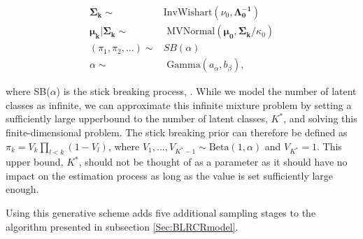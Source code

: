\documentclass[
  12pt,
]{article}
\begin{document}
\begin{align}
\boldsymbol{\Sigma_k} \sim & \text{InvWishart}(\nu_{0},\boldsymbol{\Lambda_{0}^{-1}}) \\
\boldsymbol{\mu_k}|\boldsymbol{\Sigma_k} \sim & \text{ MVNormal}(\boldsymbol{\mu_{0}},\boldsymbol{\Sigma_k}/\kappa_{0}) \\
(\pi_1,\pi_2,...) \sim & SB(\alpha) \\
\alpha \sim & \text{ Gamma}(a_{\alpha},b_{\beta}),
\end{align}

where SB(\(\alpha\)) is the stick breaking process,
\citep{ishwaran_gibbs_2001}. While we model the number of latent classes
as infinite, we can approximate this infinite mixture problem by setting
a sufficiently large upperbound to the number of latent classes,
\(K^*\), and solving this finite-dimensional problem. The stick breaking
prior can therefore be defined as \(\pi_k = V_k \prod_{l<k}(1-V_l)\),
where \(V_1, ..., V_{K^*-1} \sim \text{Beta}(1,\alpha)\) and
\(V_{K^*}=1\). This upper bound, \(K^*\), should not be thought of as a
parameter as it should have no impact on the estimation process as long
as the value is set sufficiently large enough.

Using this generative scheme adds five additional sampling stages to the
algorithm presented in subsection \ref{Sec:BLRCRmodel}.
\end{document}
